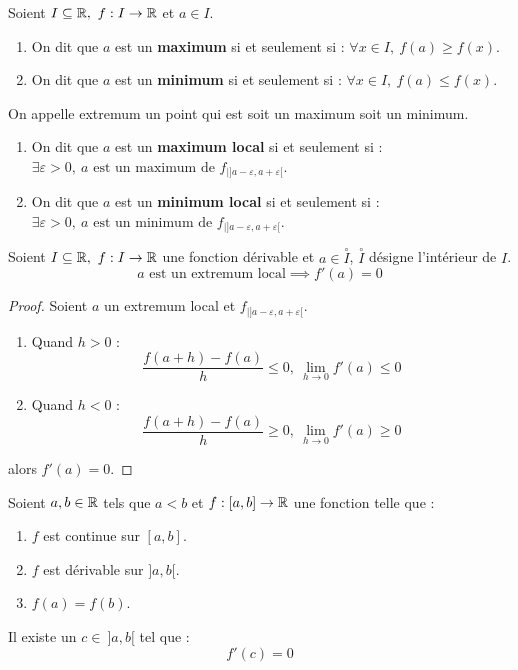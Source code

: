 \begin{definition}
    Soient $I \subseteq \mathbb{R},\ f : I \to \mathbb{R}$ et $a \in I$.
    \begin{enumerate}
        \item On dit que $a$ est un \textbf{maximum} si et seulement si : $\forall x \in I,\ f(a) \geq f(x)$.
        \item On dit que $a$ est un \textbf{minimum} si et seulement si : $\forall x \in I,\ f(a) \leq f(x)$.
    \end{enumerate}
    On appelle extremum un point qui est soit un maximum soit un minimum.
    \begin{enumerate}
        \item On dit que $a$ est un \textbf{maximum local} si et seulement si : $\exists \varepsilon > 0,\ a \text{ est un maximum de } f_{|]a - \varepsilon, a + \varepsilon[}$.
        \item On dit que $a$ est un \textbf{minimum local} si et seulement si : $\exists \varepsilon > 0,\ a \text{ est un minimum de } f_{|]a - \varepsilon, a + \varepsilon[}$.
    \end{enumerate}
\end{definition}

\begin{theorem}
	Soient $I \subseteq \mathbb{R},\ f : I \to \mathbb{R}$ une fonction dérivable et $a \in \overset{\circ}{I}$, $\overset{\circ}{I}$ désigne l'intérieur de $I$. 
	\[ a \text{ est un extremum local} \implies f'(a) = 0 \]
\end{theorem}

\begin{proof}
	Soient $a$ un extremum local et $f_{|]a - \varepsilon, a + \varepsilon[}$.
	\\
	\begin{enumerate}
		\item Quand $h > 0$ : 
		\[ \frac{f(a + h) - f(a)}{h} \leq 0,\ \lim_{h \to 0} f'(a) \leq 0 \]
		\item Quand $h < 0$ :
		\[ \frac{f(a + h) - f(a)}{h} \geq 0,\ \lim_{h \to 0} f'(a) \geq 0 \]
	\end{enumerate}
	alors $f'(a) = 0$.
\end{proof}

\begin{theorem}
    Soient $a, b \in \mathbb{R}$ tels que $a < b$ et $f : [a, b] \to \mathbb{R}$ une fonction telle que :
    \begin{enumerate}
            \item $f$ est continue sur $[a, b]$.
            \item $f$ est dérivable sur $]a, b[$.
            \item $f(a) = f(b)$.
        \end{enumerate}
    \par \noindent Il existe un $c \in \ ]a, b[$ tel que : \[ f'(c) = 0 \]
\end{theorem}

